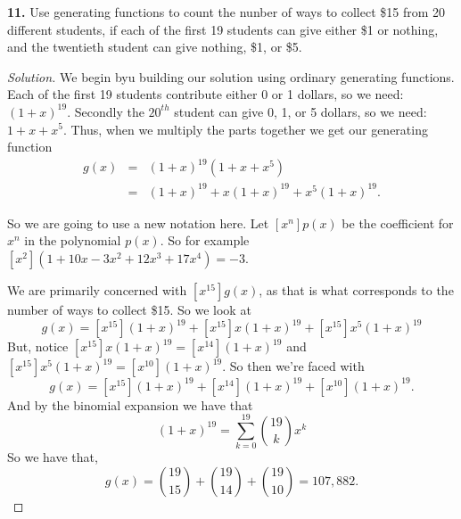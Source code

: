 \documentclass[12pt]{amsart}
\newenvironment{solution}
{\begin{proof}[Solution]}
{\end{proof}}
\begin{document}
\begin{onehalfspace}
        \noindent\textbf{11.} Use generating functions to count the nunber of ways to collect \$15 from 20 different
        students, if each of the first 19 students can give either \$1 or nothing, and the twentieth student can give
        nothing, \$1, or \$5.
        \begin{solution}
            We begin byu building our solution using ordinary generating functions.
            Each of the first 19 students contribute either 0 or 1 dollars, so we need: $(1+x)^{19}$.
            Secondly the $20^{th}$ student can give 0, 1, or 5 dollars, so we need: $1+x+x^5$.
            Thus, when we multiply the parts together we get our generating function
            \begin{eqnarray*}
                g(x) & = & (1+x)^{19}(1+x+x^5)\\
                & = & (1+x)^{19} + x(1+x)^{19} + x^5(1+x)^{19}.
            \end{eqnarray*}

            So we are going to use a new notation here. Let $[x^n]p(x)$ be the coefficient for $x^n$ in the
            polynomial $p(x)$.
            So for example $[x^2](1 + 10x - 3x^2 + 12x^3 + 17x^4) = -3$.

            We are primarily concerned with $[x^{15}]g(x)$, as that is what corresponds to the number of ways to collect \$15.
            So we look at
            \begin{displaymath}
                [x^{15}]g(x) = [x^{15}](1+x)^{19} + [x^{15}]x(1+x)^{19} + [x^{15}]x^5(1+x)^{19}
            \end{displaymath}
            But, notice $[x^{15}]x(1+x)^{19}=[x^{14}](1+x)^{19}$ and $[x^{15}]x^5(1+x)^{19}=[x^{10}](1+x)^{19}$.
            So then we're faced with
            \begin{displaymath}
                [x^{15}]g(x) = [x^{15}](1+x)^{19} + [x^{14}](1+x)^{19} + [x^{10}](1+x)^{19}.
            \end{displaymath}
            And by the binomial expansion we have that
            \begin{displaymath}
                (1+x)^{19} = \sum_{k=0}^{19}\binom{19}{k}x^k
            \end{displaymath}
            So we have that,
            \begin{displaymath}
                [x^{15}]g(x) = \binom{19}{15} + \binom{19}{14} + \binom{19}{10} = 107,882.
            \end{displaymath}
        \end{solution}


\end{onehalfspace}
\end{document}
